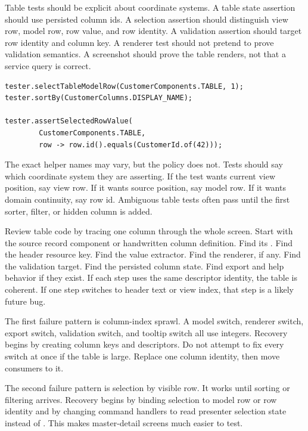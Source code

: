 Table tests should be explicit about coordinate systems. A table state
assertion should use persisted column ids. A selection assertion should
distinguish view row, model row, row value, and row identity. A validation
assertion should target row identity and column key. A renderer test should
not pretend to prove validation semantics. A screenshot should prove the table
renders, not that a service query is correct.

\begin{lstlisting}[caption={Testing selection after sorting by row value.}]
tester.selectTableModelRow(CustomerComponents.TABLE, 1);
tester.sortBy(CustomerColumns.DISPLAY_NAME);

tester.assertSelectedRowValue(
        CustomerComponents.TABLE,
        row -> row.id().equals(CustomerId.of(42)));
\end{lstlisting}

The exact helper names may vary, but the policy does not. Tests should say
which coordinate system they are asserting. If the test wants current view
position, say view row. If it wants source position, say model row. If it wants
domain continuity, say row id. Ambiguous table tests often pass until the
first sorter, filter, or hidden column is added.

Review table code by tracing one column through the whole screen. Start with
the source record component or handwritten column definition. Find its
. Find the header resource key. Find the value extractor. Find
the renderer, if any. Find the validation target. Find the persisted column
state. Find export and help behavior if they exist. If each step uses the same
descriptor identity, the table is coherent. If one step switches to header
text or view index, that step is a likely future bug.

The first failure pattern is column-index sprawl. A model switch, renderer
switch, export switch, validation switch, and tooltip switch all use integers.
Recovery begins by creating column keys and descriptors. Do not attempt to fix
every switch at once if the table is large. Replace one column identity, then
move consumers to it.

The second failure pattern is selection by visible row. It works until sorting
or filtering arrives. Recovery begins by binding selection to model row or row
identity and by changing command handlers to read presenter selection state
instead of . This makes master-detail screens much
easier to test.

